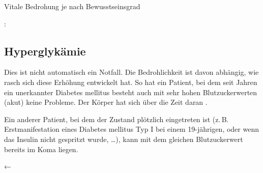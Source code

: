 {Vitale
Bedrohung je nach Bewusstseinsgrad

: 
}{}
% 
%   
%   

\subsection{Hyperglykämie}
\label{topic:hyperglykaemie}




{%
Dies ist nicht automatisch
ein Notfall. Die Bedrohlichkeit ist davon
abhängig, wie rasch sich diese Erhöhung entwickelt hat. So
hat ein Patient, bei dem seit Jahren ein unerkannter
Diabetes mellitus besteht auch mit sehr hohen
Blutzuckerwerten (akut) keine Probleme. Der Körper hat sich
über die Zeit daran .

Ein anderer Patient, bei dem der Zustand plötzlich
eingetreten ist (z.\,B. Erstmanifestation eines Diabetes
mellitus Typ I bei einem 19-jährigen, oder wenn das Insulin
nicht gespritzt wurde, \ldots), kann mit dem gleichen
Blutzuckerwert bereits im Koma liegen.

 }
{←}
{}{}{}



